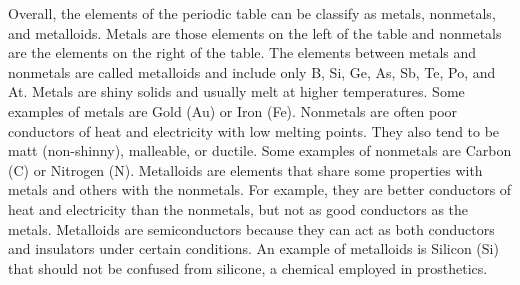 \documentclass[main.tex]{subfiles}
\newcommand\chapterlabel{table}
\begin{document}
\begin{description}
\begin{minipage}[b]{1.5\linewidth}
\begin{tikzpicture}[font=\sffamily, scale=0.30, transform shape]
\end{tikzpicture}\end{minipage}



\item[\docfilehook{Metals, Nonmetals, and Metalloids}{Metals, Nonmetals, and Metalloids}] Overall, the elements of the periodic table can be classify as metals, nonmetals, and metalloids. Metals are those elements on the left of the table and nonmetals are the elements on the right of the table. The elements between metals and nonmetals are called metalloids and include only B, Si, Ge, As, Sb, Te, Po, and At. Metals are shiny solids and usually melt at higher temperatures. Some examples of metals are Gold (Au) or Iron (Fe). Nonmetals are often poor conductors of heat and electricity with low melting points. They also tend to be matt (non-shinny), malleable, or ductile. Some examples of nonmetals are Carbon (C) or Nitrogen (N). Metalloids are elements that share some properties with metals and others with the nonmetals. For example, they are better conductors of heat and electricity than the nonmetals, but not as good conductors as the metals. Metalloids are semiconductors because they can act as both conductors and insulators under certain conditions. An example of metalloids is Silicon (Si) that should not be confused from silicone, a chemical employed in prosthetics.


\end{description}
\end{document}
